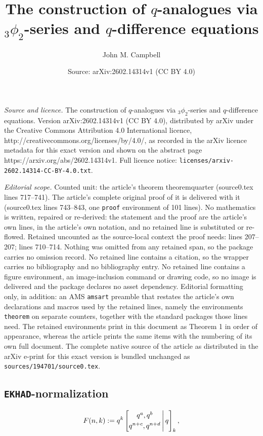 \documentclass[10pt,a4paper]{amsart}
\title{The construction of $q$-analogues via $_3\phi_2$-series and $q$-difference equations}
\author{John M. Campbell}
\date{Source: arXiv:2602.14314v1 (CC BY 4.0)}
\begin{document}
\maketitle

\noindent\emph{Source and licence.} The construction of $q$-analogues via $_3\phi_2$-series and $q$-difference equations. Version arXiv:2602.14314v1 (CC BY 4.0), distributed by arXiv under the Creative Commons Attribution 4.0 International licence, http://creativecommons.org/licenses/by/4.0/, as recorded in the arXiv licence metadata for this exact version and shown on the abstract page https://arxiv.org/abs/2602.14314v1. Full licence notice: \texttt{licenses/arxiv-2602.14314-CC-BY-4.0.txt}.\par\smallskip

\noindent\textit{Editorial scope.} Counted unit: the article's theorem theoremquarter (source0.tex lines 717--741). The article's complete original proof of it is delivered with it (source0.tex lines 743--843, one \texttt{proof} environment of 101 lines). No mathematics is written, repaired or re-derived: the statement and the proof are the article's own lines, in the article's own notation, and no retained line is substituted or re-flowed.  Retained uncounted as the source-local context the proof needs: lines 207--207; lines 710--714.  Nothing was omitted from any retained span, so the package carries no omission record.  No retained line contains a citation, so the wrapper carries no bibliography and no bibliography entry.  No retained line contains a figure environment, an image-inclusion command or drawing code, so no image is delivered and the package declares no asset dependency.  Editorial formatting only, in addition: an AMS \texttt{amsart} preamble that restates the article's own declarations and macros used by the retained lines, namely the environments \texttt{theorem} on separate counters, together with the standard packages those lines need.  The retained environments print in this document as Theorem 1 in order of appearance, whereas the article prints the same items with the numbering of its own full document.  The complete native source of the article as distributed in the arXiv e-print for this exact version is bundled unchanged as \texttt{sources/194701/source0.tex}.
\subsection{{\tt EKHAD}-normalization}\label{sectionEKHAD}

\begin{equation}\label{prototypeqF}
 F(n, k) := q^{k} \left[ \begin{matrix} 
 q^{a}, q^{b} \vspace{1mm} \\ 
 q^{n+c}, q^{n+d} \end{matrix} \, \Bigg| \, q \right]_{k}, 
\end{equation}
\end{document}
